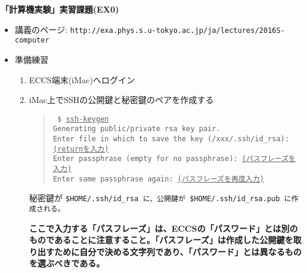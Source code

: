 \documentclass[11pt]{jarticle}
\begin{document}
\noindent
{\bf\large 「計算機実験」実習課題(EX0)}
\\[-0.5em]

\noindent
\begin{itemize}
\item 講義のページ: \verb+http://exa.phys.s.u-tokyo.ac.jp/ja/lectures/2016S-computer+
\item 準備練習
  \begin{enumerate}
  \item ECCS端末(iMac)へログイン
  \item iMac上でSSHの公開鍵と秘密鍵のペアを作成する
    \begin{quote} \tt
      \$ \underline{ssh-keygen} \\
      Generating public/private rsa key pair.\\
      Enter file in which to save the key (/xxx/.ssh/id\_rsa): \underline{(returnを入力)}\\
      Enter passphrase (empty for no passphrase): \underline{(パスフレーズを入力)}\\
      Enter same passphrase again: \underline{(パスフレーズを再度入力)}
    \end{quote}
    秘密鍵が \tt{\$HOME/.ssh/id\_rsa} に、公開鍵が \tt{\$HOME/.ssh/id\_rsa.pub} に作成される。
    
    {\bf ここで入力する「パスフレーズ」は、ECCSの「パスワード」とは別のものであることに注意すること。「パスフレーズ」は作成した公開鍵を取り出すために自分で決める文字列であり、「パスワード」とは異なるものを選ぶべきである。}


\end{enumerate}
\end{itemize}
\end{document}
